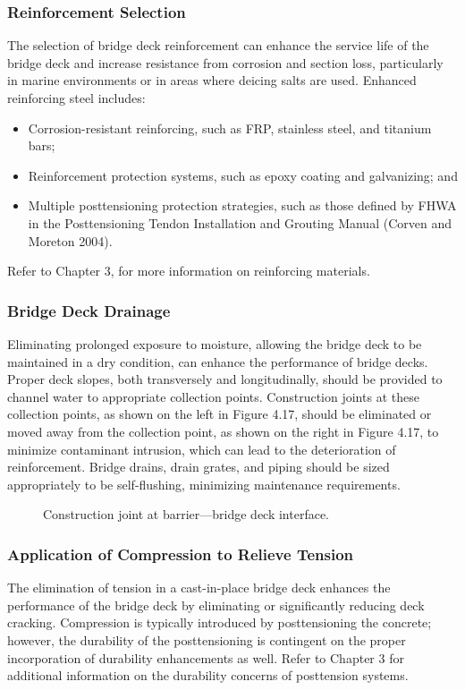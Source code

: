 \subsubsection{Reinforcement Selection}
The selection of bridge deck reinforcement can enhance the service life of the bridge deck and increase resistance
from corrosion and section loss, particularly in marine environments or in areas where deicing salts are used.
Enhanced reinforcing steel includes:
\begin{itemize}
  \item Corrosion-resistant reinforcing, such as FRP, stainless steel, and titanium bars;
  \item Reinforcement protection systems, such as epoxy coating and galvanizing; and
  \item Multiple posttensioning protection strategies, such as those defined by FHWA in the Posttensioning Tendon
  Installation and Grouting Manual (Corven and Moreton 2004).
\end{itemize}

Refer to Chapter 3, for more information on reinforcing materials.

\subsubsection{Bridge Deck Drainage}
Eliminating prolonged exposure to moisture, allowing the bridge deck to be maintained in a dry condition, can
enhance the performance of bridge decks. Proper deck slopes, both transversely and longitudinally, should be
provided to channel water to appropriate collection points. Construction joints at these collection points, as shown on
the left in Figure 4.17, should be eliminated or moved away from the collection point, as shown on the right in Figure
4.17, to minimize contaminant intrusion, which can lead to the deterioration of reinforcement. Bridge drains, drain
grates, and piping should be sized appropriately to be self-flushing, minimizing maintenance requirements.

\begin{figure}
  \caption{Construction joint at barrier—bridge deck interface.}
  \label{fig:joint-barrier}
\end{figure}

\subsubsection{Application of Compression to Relieve Tension}
The elimination of tension in a cast-in-place bridge deck enhances the performance of the bridge deck by
eliminating or significantly reducing deck cracking. Compression is typically introduced by posttensioning the
concrete; however, the durability of the posttensioning is contingent on the proper incorporation of durability
enhancements as well. Refer to Chapter 3 for additional information on the durability concerns of posttension
systems.

